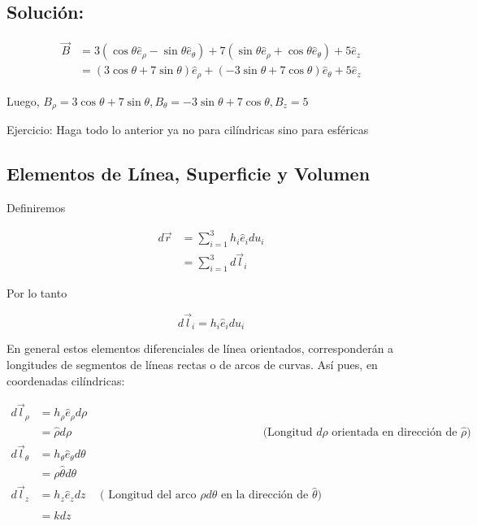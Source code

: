 \subsection{Solución:}
$$
\begin{aligned}
\vec{B} & =3\left(\cos \theta \widehat{e}_{\rho}-\sin \theta \widehat{e}_{\theta}\right)+7\left(\sin \theta \widehat{e}_{\rho}+\cos \theta \widehat{e}_{\theta}\right)+5 \widehat{e}_{z} \\
& =(3 \cos \theta+7 \sin \theta) \widehat{e}_{\rho}+(-3 \sin \theta+7 \cos \theta) \widehat{e}_{\theta}+5 \widehat{e}_{z}
\end{aligned}
$$

Luego, $B_{\rho}=3 \cos \theta+7 \sin \theta, B_{\theta}=-3 \sin \theta+7 \cos \theta, B_{z}=5$

Ejercicio: Haga todo lo anterior ya no para cilíndricas sino para esféricas

\subsection{Elementos de Línea, Superficie y Volumen}
Definiremos

$$
\begin{aligned}
d \vec{r} & =\sum_{i=1}^{3} h_{i} \widehat{e}_{i} d u_{i} \\
& =\sum_{i=1}^{3} d \vec{l}_{i}
\end{aligned}
$$

Por lo tanto

$$
d \vec{l}_{i}=h_{i} \widehat{e}_{i} d u_{i}
$$

En general estos elementos diferenciales de línea orientados, corresponderán a longitudes de segmentos de líneas rectas o de arcos de curvas. Así pues, en coordenadas cilíndricas:

$$
\begin{array}{rlrl}
d \vec{l}_{\rho} & =h_{\rho} \widehat{e}_{\rho} d \rho & \\
& =\widehat{\rho} d \rho & & \text { (Longitud } d \rho \text { orientada en dirección de } \widehat{\rho}) \\
d \vec{l}_{\theta} & =h_{\theta} \widehat{e}_{\theta} d \theta & \\
& =\rho \hat{\theta} d \theta & & \\
d \vec{l}_{z} & =h_{z} \widehat{e}_{z} d z & \text { ( Longitud del arco } \rho d \theta \text { en la dirección de } \hat{\theta}) \\
& =\hat{k} d z \quad & \quad
\end{array}
$$

